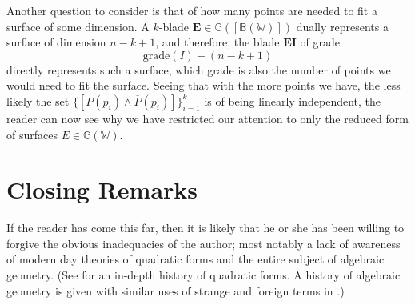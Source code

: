 \documentclass{birkjour}
\theoremstyle{definition}
\theoremstyle{remark}
\numberwithin{equation}{section}
\newcommand{\G}{\mathbb{G}}
\newcommand{\W}{\mathbb{W}}
\newcommand{\B}{\mathbb{B}}
\begin{document}
Another question to consider is that of how many points are needed
to fit a surface of some dimension.  A $k$-blade $\mathbf{E}\in\G([\B(\W)])$
dually represents a surface of dimension $n-k+1$, and therefore,
the blade $\mathbf{EI}$ of grade
\begin{equation}
\mbox{grade}(I)-(n-k+1)
\end{equation}
directly represents
such a surface, which grade is also the number of points we would need
to fit the surface.  Seeing that with the more points we have, the less likely
the set $\{[P(p_i)\wedge\overline{P}(p_i)]\}_{i=1}^k$ is of being linearly independent,
the reader can now see why
we have restricted our attention to only the reduced form of surfaces $E\in\G(\W)$.

\section{Closing Remarks}

If the reader has come this far, then it is likely that he or she has been willing
to forgive the obvious inadequacies of the author; most notably a lack of
awareness of modern day theories of quadratic forms and the entire subject of algebraic
geometry.  (See \cite{} for an in-depth history of quadratic forms.  A history
of algebraic geometry is given with similar uses of strange and foreign terms in \cite{}.)


\nocite{Dorst07}



\end{document}
